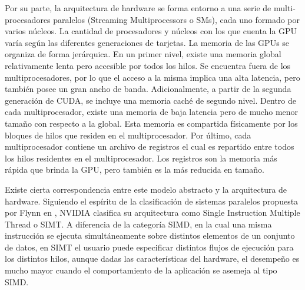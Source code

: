 Por su parte, la arquitectura de hardware se forma entorno a una serie de multi-procesadores paralelos (Streaming Multiprocessors o SMs), cada uno formado por varios núcleos. La cantidad de procesadores y núcleos con los que cuenta la GPU varía según las diferentes generaciones de tarjetas. 
La memoria de las GPUs se organiza de forma jerárquica. En un primer nivel, existe una memoria global relativamente lenta pero accesible por todos los hilos. Se encuentra fuera de los multiprocesadores, por lo que el acceso a la misma implica una alta latencia, pero también posee un gran ancho de banda. Adicionalmente, a partir de la segunda generación de CUDA, se incluye una memoria caché de segundo nivel. Dentro de cada multiprocesador, existe una memoria de baja latencia pero de mucho menor tamaño con respecto a la global. Esta memoria es compartida físicamente por los bloques de hilos que residen en el multiprocesador. Por último, cada multiprocesador contiene un archivo de registros el cual es repartido entre todos los hilos residentes en el multiprocesador. Los registros son la memoria más rápida que brinda la GPU, pero también es la más reducida en tamaño.

Existe cierta correspondencia entre este modelo abstracto y la arquitectura de hardware. Siguiendo el espíritu de la clasificación de sistemas paralelos propuesta por Flynn en \cite{Flynn1972}, NVIDIA clasifica su arquitectura como Single Instruction Multiple Thread o SIMT. A diferencia de la categoría SIMD, en la cual una misma instrucción  se ejecuta simultáneamente sobre distintos elementos de un conjunto de datos, en SIMT el usuario puede  especificar distintos flujos de ejecución para los distintos hilos, aunque dadas las características  del hardware, el desempeño es mucho mayor cuando el comportamiento de la aplicación se asemeja al tipo SIMD.
 
